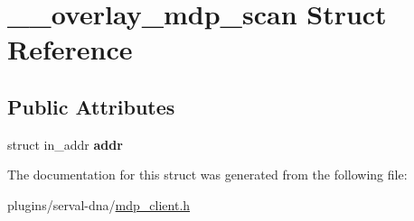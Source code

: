 \hypertarget{struct____overlay__mdp__scan}{\section{\+\_\+\+\_\+overlay\+\_\+mdp\+\_\+scan Struct Reference}
\label{struct____overlay__mdp__scan}
}
\subsection*{Public Attributes}
\begin{DoxyCompactItemize}
\item 
\hypertarget{struct____overlay__mdp__scan_a13ce0dc38b81f4c6e0cd82900742ce16}{struct in\+\_\+addr {\bfseries addr}}\label{struct____overlay__mdp__scan_a13ce0dc38b81f4c6e0cd82900742ce16}

\end{DoxyCompactItemize}


The documentation for this struct was generated from the following file\+:\begin{DoxyCompactItemize}
\item 
plugins/serval-\/dna/\hyperlink{mdp__client_8h}{mdp\+\_\+client.\+h}\end{DoxyCompactItemize}
